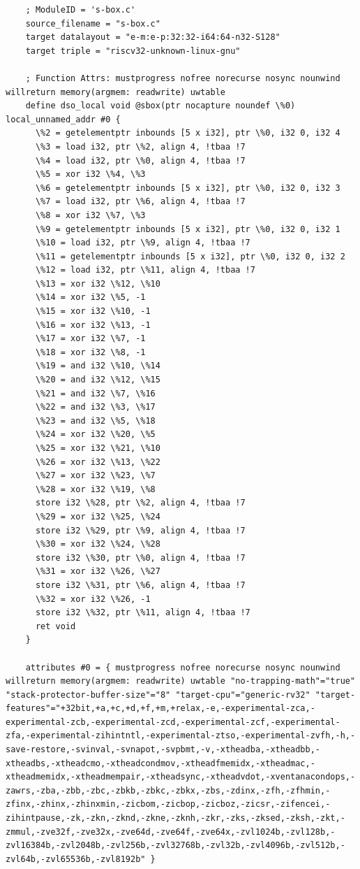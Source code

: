 \begin{lstlisting}
    ; ModuleID = 's-box.c'
    source_filename = "s-box.c"
    target datalayout = "e-m:e-p:32:32-i64:64-n32-S128"
    target triple = "riscv32-unknown-linux-gnu"
    
    ; Function Attrs: mustprogress nofree norecurse nosync nounwind willreturn memory(argmem: readwrite) uwtable
    define dso_local void @sbox(ptr nocapture noundef \%0) local_unnamed_addr #0 {
      \%2 = getelementptr inbounds [5 x i32], ptr \%0, i32 0, i32 4
      \%3 = load i32, ptr \%2, align 4, !tbaa !7
      \%4 = load i32, ptr \%0, align 4, !tbaa !7
      \%5 = xor i32 \%4, \%3
      \%6 = getelementptr inbounds [5 x i32], ptr \%0, i32 0, i32 3
      \%7 = load i32, ptr \%6, align 4, !tbaa !7
      \%8 = xor i32 \%7, \%3
      \%9 = getelementptr inbounds [5 x i32], ptr \%0, i32 0, i32 1
      \%10 = load i32, ptr \%9, align 4, !tbaa !7
      \%11 = getelementptr inbounds [5 x i32], ptr \%0, i32 0, i32 2
      \%12 = load i32, ptr \%11, align 4, !tbaa !7
      \%13 = xor i32 \%12, \%10
      \%14 = xor i32 \%5, -1
      \%15 = xor i32 \%10, -1
      \%16 = xor i32 \%13, -1
      \%17 = xor i32 \%7, -1
      \%18 = xor i32 \%8, -1
      \%19 = and i32 \%10, \%14
      \%20 = and i32 \%12, \%15
      \%21 = and i32 \%7, \%16
      \%22 = and i32 \%3, \%17
      \%23 = and i32 \%5, \%18
      \%24 = xor i32 \%20, \%5
      \%25 = xor i32 \%21, \%10
      \%26 = xor i32 \%13, \%22
      \%27 = xor i32 \%23, \%7
      \%28 = xor i32 \%19, \%8
      store i32 \%28, ptr \%2, align 4, !tbaa !7
      \%29 = xor i32 \%25, \%24
      store i32 \%29, ptr \%9, align 4, !tbaa !7
      \%30 = xor i32 \%24, \%28
      store i32 \%30, ptr \%0, align 4, !tbaa !7
      \%31 = xor i32 \%26, \%27
      store i32 \%31, ptr \%6, align 4, !tbaa !7
      \%32 = xor i32 \%26, -1
      store i32 \%32, ptr \%11, align 4, !tbaa !7
      ret void
    }
    
    attributes #0 = { mustprogress nofree norecurse nosync nounwind willreturn memory(argmem: readwrite) uwtable "no-trapping-math"="true" "stack-protector-buffer-size"="8" "target-cpu"="generic-rv32" "target-features"="+32bit,+a,+c,+d,+f,+m,+relax,-e,-experimental-zca,-experimental-zcb,-experimental-zcd,-experimental-zcf,-experimental-zfa,-experimental-zihintntl,-experimental-ztso,-experimental-zvfh,-h,-save-restore,-svinval,-svnapot,-svpbmt,-v,-xtheadba,-xtheadbb,-xtheadbs,-xtheadcmo,-xtheadcondmov,-xtheadfmemidx,-xtheadmac,-xtheadmemidx,-xtheadmempair,-xtheadsync,-xtheadvdot,-xventanacondops,-zawrs,-zba,-zbb,-zbc,-zbkb,-zbkc,-zbkx,-zbs,-zdinx,-zfh,-zfhmin,-zfinx,-zhinx,-zhinxmin,-zicbom,-zicbop,-zicboz,-zicsr,-zifencei,-zihintpause,-zk,-zkn,-zknd,-zkne,-zknh,-zkr,-zks,-zksed,-zksh,-zkt,-zmmul,-zve32f,-zve32x,-zve64d,-zve64f,-zve64x,-zvl1024b,-zvl128b,-zvl16384b,-zvl2048b,-zvl256b,-zvl32768b,-zvl32b,-zvl4096b,-zvl512b,-zvl64b,-zvl65536b,-zvl8192b" }
    

\end{lstlisting}
